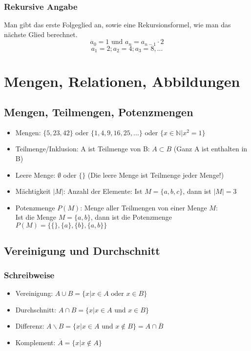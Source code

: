 \subsubsection{Rekursive Angabe}
Man gibt das erste Folgeglied an, sowie eine Rekursionsformel,
wie man das nächste Glied berechnet.
\[a_0 = 1 \text{ und } a_n = a_{n-1} \cdot 2 \]
\[ a_1 = 2; a_2 = 4; a_3 = 8, ... \]

\section{Mengen, Relationen, Abbildungen}

\subsection{Mengen, Teilmengen, Potenzmengen}
\begin{itemize}
  \item Mengen: $\{5, 23, 42\}$ oder $\{1, 4, 9, 16, 25, ...\}$ oder
  $\{x \in \mathbb{N} | x^2 = 1 \}$
  \item Teilmenge/Inklusion: A ist Teilmenge von B: $A \subset B$ (Ganz A ist enthalten in B)
  \item Leere Menge: $\emptyset$ oder $\{ \}$ (Die leere Menge ist
    Teilmenge jeder Menge!)
  \item Mächtigkeit $|M|$: Anzahl der Elemente: Ist $M = \{a, b, c\}$, dann ist $|M| = 3$
  \item Potenzmenge $P(M)$: Menge aller Teilmengen von einer Menge $M$:
  \\ Ist die Menge $M = \{a, b\}$, dann ist die Potenzmenge $P(M) = \{\{\},
  \{a\}, \{b\}, \{a, b\}\}$
\end{itemize}

\subsection{Vereinigung und Durchschnitt}
\subsubsection{Schreibweise}
\begin{itemize}
  \item Vereinigung: $A \cup B = \{ x | x \in A \text{ oder } x \in B \}$
  \item Durchschnitt: $A \cap B = \{ x | x \in A \text{ und } x \in B \}$
  \item Differenz: $A \backslash B = \{ x | x \in A \text{ und } x
    \notin B \} = A \cap \overline B$
  \item Komplement: $\overline A = \{ x | x \notin A \}$
\end{itemize}

